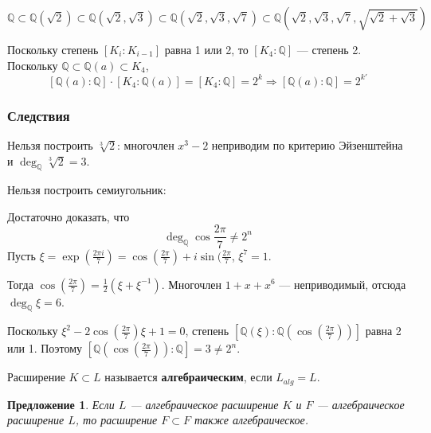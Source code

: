 \documentclass[a4paper]{article}
\newcommand{\Q}{\ensuremath{\mathbb{Q}}}
\numberwithin{theorem}{section}
\numberwithin{lemma}{section}
\newtheorem{proposition}{Предложение}
\numberwithin{proposition}{section}
\numberwithin{corollary}{section}
\begin{document}
\[\Q \subset \Q(\sqrt{2}) \subset \Q(\sqrt{2},\sqrt{3})
\subset \Q(\sqrt{2},\sqrt{3},\sqrt{7})
\subset \Q(\sqrt{2},\sqrt{3},\sqrt{7}, \sqrt{\sqrt{2}+\sqrt{3}})\]

Поскольку степень $[K_i : K_{i - 1}]$ равна 1 или 2, то $[K_4 : \Q]$ --- степень 2.
Поскольку $\Q \subset \Q(a) \subset K_4$,
\[[\Q(a) : \Q] \cdot [K_4 : \Q(a)] = [K_4 : \Q] = 2^k
\Rightarrow [\Q(a) : \Q] = 2^{k'}\]

\subsubsection*{Следствия}
Нельзя построить $\sqrt[3]{2}$: многочлен $x^3 - 2$ неприводим по критерию Эйзенштейна и $\deg_\Q \sqrt[3]{2} = 3$.

Нельзя построить семиугольник:

\begin{minipage}{0.4\linewidth}
\centering
{}
\end{minipage}
\begin{minipage}{0.6\linewidth}
Достаточно доказать, что \[\deg_\Q \cos \frac{2\pi}{7} \ne 2^n \]
Пусть $\xi = \exp(\frac{2\pi i}{7}) = \cos(\frac{2\pi}{7}) + i \sin(\frac{2\pi}{7}$, $\xi^7=1$.

Тогда $\cos(\frac{2\pi}{7}) = \frac{1}{2}(\xi + \xi^{-1})$. Многочлен $1+x+x^6$ --- неприводимый, отсюда $\deg_\Q \xi = 6$.

Поскольку $\xi^2 - 2 \cos (\frac{2\pi}{7})\xi + 1 = 0$, степень
$[\Q(\xi) : \Q(\cos (\frac{2\pi}{7}))]$ равна 2 или 1.
Поэтому $[\Q(\cos (\frac{2\pi}{7})) : \Q] = 3 \ne 2^n$.
\end{minipage}

Расширение $K \subset L$ называется \textbf{алгебраическим},
если $L_{alg} = L$.

\begin{proposition}
Если $L$ --- алгебраическое расширение $K$ и $F$ --- алгебраическое расширение $L$, то расширение $F \subset F$ также алгебраическое.
\end{proposition}
\end{document}
